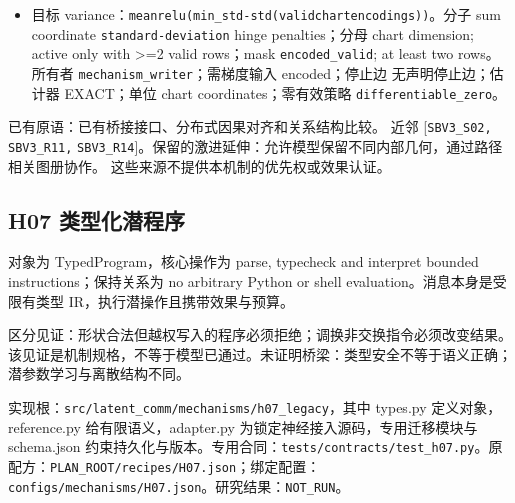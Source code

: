 \documentclass[
  10pt,
]{article}
\begin{document}
\begin{itemize}
  sum of valid terms；分母 count of valid terms；mask
  \nolinkurl{overlap_valid}。所有者
  \nolinkurl{mechanism_reader}；需梯度输入 cycled, original；停止边
  无声明停止边；估计器 EXACT；单位 chart elements；零有效策略
  \nolinkurl{differentiable_zero}。
\item
  目标
  variance：{\small\nolinkurl{mean}\hspace{0.333em}\nolinkurl{relu(min_std-std(valid}\hspace{0.333em}\nolinkurl{chart}\hspace{0.333em}\nolinkurl{encodings))}}。分子
  sum coordinate \nolinkurl{standard-deviation} hinge penalties；分母
  chart dimension; active only with \textgreater{}=2 valid rows；mask
  \nolinkurl{encoded_valid}; at least two rows。所有者
  \nolinkurl{mechanism_writer}；需梯度输入 encoded；停止边
  无声明停止边；估计器 EXACT；单位 chart coordinates；零有效策略
  \nolinkurl{differentiable_zero}。
\end{itemize}

已有原语：已有桥接接口、分布式因果对齐和关系结构比较。 近邻
{[}\nolinkurl{SBV3_S02,} \nolinkurl{SBV3_R11,}
\nolinkurl{SBV3_R14}{]}。保留的激进延伸：允许模型保留不同内部几何，通过路径相关图册协作。
这些来源不提供本机制的优先权或效果认证。

\subsection{H07
类型化潜程序}\label{h07-ux7c7bux578bux5316ux6f5cux7a0bux5e8f}

对象为 TypedProgram，核心操作为 parse, typecheck and interpret bounded
instructions；保持关系为 no arbitrary Python or shell
evaluation。消息本身是受限有类型 IR，执行潜操作且携带效果与预算。

区分见证：形状合法但越权写入的程序必须拒绝；调换非交换指令必须改变结果。
该见证是机制规格，不等于模型已通过。未证明桥梁：类型安全不等于语义正确；潜参数学习与离散结构不同。

实现根：{\small\nolinkurl{src/latent_comm/mechanisms/h07_legacy}}，其中
types.py 定义对象，reference.py 给有限语义，adapter.py
为锁定神经接入源码，专用迁移模块与 schema.json
约束持久化与版本。专用合同：{\small\nolinkurl{tests/contracts/test_h07.py}}。原配方：{\small\nolinkurl{PLAN_ROOT/recipes/H07.json}}；绑定配置：{\small\nolinkurl{configs/mechanisms/H07.json}}。研究结果：\nolinkurl{NOT_RUN}。
\end{document}
